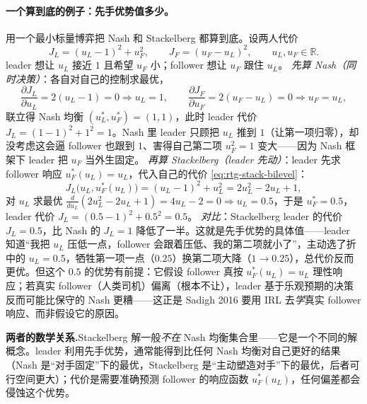 \paragraph{一个算到底的例子：先手优势值多少。}
用一个最小标量博弈把 Nash 和 Stackelberg 都算到底\cite{sadigh2016planning}。设两人代价
\begin{equation}
  J_L=(u_L-1)^2+u_F^2,\qquad J_F=(u_F-u_L)^2,\qquad u_L,u_F\in\mathbb{R}.
  \label{eq:rtg-toy-game}
\end{equation}
leader 想让 $u_L$ 接近 $1$ 且希望 $u_F$ 小；follower 想让 $u_F$ 跟住 $u_L$。
\emph{先算 Nash（同时决策）}：各自对自己的控制求最优，
\[
  \frac{\partial J_L}{\partial u_L}=2(u_L-1)=0\Rightarrow u_L=1,\qquad
  \frac{\partial J_F}{\partial u_F}=2(u_F-u_L)=0\Rightarrow u_F=u_L,
\]
联立得 Nash 均衡 $(u_L^*,u_F^*)=(1,1)$，此时 leader 代价 $J_L=(1-1)^2+1^2=1$。Nash 里 leader 只顾把 $u_L$ 推到 $1$（让第一项归零），却没考虑这会逼 follower 也跟到 $1$、害得自己第二项 $u_F^2=1$ 变大——因为 Nash 框架下 leader 把 $u_F$ 当外生固定。
\emph{再算 Stackelberg（leader 先动）}：leader 先求 follower 响应 $u_F^*(u_L)=u_L$，代入自己的代价 \cref{eq:rtg-stack-bilevel}：
\[
  J_L\big(u_L,u_F^*(u_L)\big)=(u_L-1)^2+u_L^2=2u_L^2-2u_L+1,
\]
对 $u_L$ 求最优 $\tfrac{d}{du_L}(2u_L^2-2u_L+1)=4u_L-2=0\Rightarrow u_L=0.5$，于是 $u_F^*=0.5$，leader 代价 $J_L=(0.5-1)^2+0.5^2=0.5$。
\emph{对比}：Stackelberg leader 的代价 $J_L=0.5$，比 Nash 的 $J_L=1$ 降低了一半。这就是先手优势的具体值——leader 知道“我把 $u_L$ 压低一点，follower 会跟着压低、我的第二项就小了”，主动选了折中的 $u_L=0.5$，牺牲第一项一点（$0.25$）换第二项大降（$1\to0.25$），总代价反而更优。但这个 $0.5$ 的优势有前提：它假设 follower 真按 $u_F^*(u_L)=u_L$ 理性响应；若真实 follower（人类司机）偏离（根本不让），leader 基于乐观预期的决策反而可能比保守的 Nash 更糟——这正是 Sadigh 2016 要用 IRL 去\emph{学}真实 follower 响应、而非假设它的原因。

\begin{note}
\textbf{两者的数学关系.}\;Stackelberg 解一般\emph{不在} Nash 均衡集合里——它是一个不同的解概念。leader 利用先手优势，通常能得到比任何 Nash 均衡对自己更好的结果（Nash 是“对手固定”下的最优，Stackelberg 是“主动塑造对手”下的最优，后者可行空间更大）；代价是需要准确预测 follower 的响应函数 $u_F^*(u_L)$，任何偏差都会侵蚀这个优势。
\end{note}


